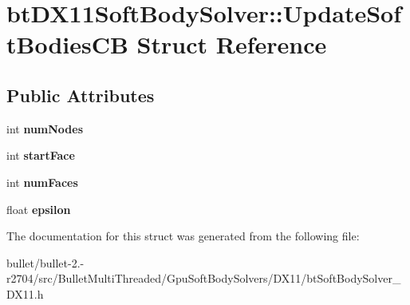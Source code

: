 \hypertarget{structbt_d_x11_soft_body_solver_1_1_update_soft_bodies_c_b}{\section{bt\+D\+X11\+Soft\+Body\+Solver\+:\+:Update\+Soft\+Bodies\+C\+B Struct Reference}
\label{structbt_d_x11_soft_body_solver_1_1_update_soft_bodies_c_b}
}
\subsection*{Public Attributes}
\begin{DoxyCompactItemize}
\item 
\hypertarget{structbt_d_x11_soft_body_solver_1_1_update_soft_bodies_c_b_af1cdbda5c9886b8c39f080ecb30d32cf}{int {\bfseries num\+Nodes}}\label{structbt_d_x11_soft_body_solver_1_1_update_soft_bodies_c_b_af1cdbda5c9886b8c39f080ecb30d32cf}

\item 
\hypertarget{structbt_d_x11_soft_body_solver_1_1_update_soft_bodies_c_b_a1302ae486743ee817cfbe664c5ade84f}{int {\bfseries start\+Face}}\label{structbt_d_x11_soft_body_solver_1_1_update_soft_bodies_c_b_a1302ae486743ee817cfbe664c5ade84f}

\item 
\hypertarget{structbt_d_x11_soft_body_solver_1_1_update_soft_bodies_c_b_a8e50533bbde09468c870d2920575cd81}{int {\bfseries num\+Faces}}\label{structbt_d_x11_soft_body_solver_1_1_update_soft_bodies_c_b_a8e50533bbde09468c870d2920575cd81}

\item 
\hypertarget{structbt_d_x11_soft_body_solver_1_1_update_soft_bodies_c_b_a49daa83937559f4d017c55d4a56a2d0d}{float {\bfseries epsilon}}\label{structbt_d_x11_soft_body_solver_1_1_update_soft_bodies_c_b_a49daa83937559f4d017c55d4a56a2d0d}

\end{DoxyCompactItemize}


The documentation for this struct was generated from the following file\+:\begin{DoxyCompactItemize}
\item 
bullet/bullet-\/2.-\/r2704/src/\+Bullet\+Multi\+Threaded/\+Gpu\+Soft\+Body\+Solvers/\+D\+X11/bt\+Soft\+Body\+Solver\+\_\+\+D\+X11.\+h\end{DoxyCompactItemize}
